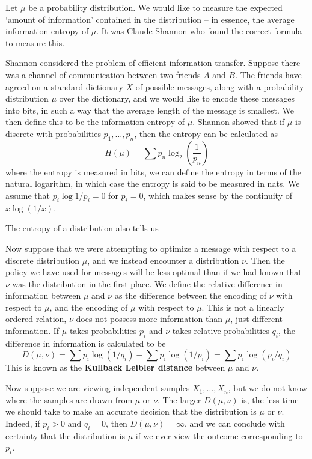 Let $\mu$ be a probability distribution. We would like to measure the expected `amount of information' contained in the distribution -- in essence, the average information entropy of $\mu$. It was Claude Shannon who found the correct formula to measure this.

Shannon considered the problem of efficient information transfer. Suppose there was a channel of communication between two friends $A$ and $B$. The friends have agreed on a standard dictionary $X$ of possible messages, along with a probability distribution $\mu$ over the dictionary, and we would like to encode these messages into bits, in such a way that the average length of the message is smallest. We then define this to be the information entropy of $\mu$. Shannon showed that if $\mu$ is discrete with probabilities $p_1, \dots, p_n$, then the entropy can be calculated as
%
\[ H(\mu) = \sum p_n \log_2 \left( \frac{1}{p_n} \right) \]
%
where the entropy is measured in bits, we can define the entropy in terms of the natural logarithm, in which case the entropy is said to be measured in nats. We assume that $p_i \log 1/p_i = 0$ for $p_i = 0$, which makes sense by the continuity of $x \log (1/x)$.

The entropy of a distribution also tells us 

Now suppose that we were attempting to optimize a message with respect to a discrete distribution $\mu$, and we instead encounter a distribution $\nu$. Then the policy we have used for messages will be less optimal than if we had known that $\nu$ was the distribution in the first place. We define the relative difference in information between $\mu$ and $\nu$ as the difference between the encoding of $\nu$ with respect to $\mu$, and the encoding of $\mu$ with respect to $\mu$. This is not a linearly ordered relation, $\nu$ does not possess more information than $\mu$, just different information. If $\mu$ takes probabilities $p_i$ and $\nu$ takes relative probabilities $q_i$, the difference in information is calculated to be
%
\[ D(\mu, \nu) = \sum p_i \log(1/q_i) - \sum p_i \log(1/p_i) = \sum p_i \log(p_i/q_i) \]
%
This is known as the {\bf Kullback Leibler distance} between $\mu$ and $\nu$.

Now suppose we are viewing independent samples $X_1, \dots, X_n$, but we do not know where the samples are drawn from $\mu$ or $\nu$. The larger $D(\mu, \nu)$ is, the less time we should take to make an accurate decision that the distribution is $\mu$ or $\nu$. Indeed, if $p_i > 0$ and $q_i = 0$, then $D(\mu, \nu) = \infty$, and we can conclude with certainty that the distribution is $\mu$ if we ever view the outcome corresponding to $p_i$.

